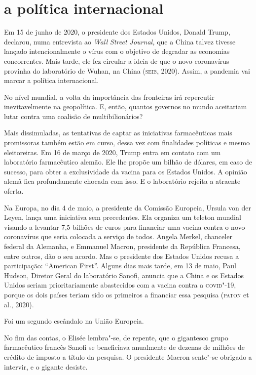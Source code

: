 \section{a política internacional}

Em 15 de junho de 2020, o presidente dos Estados Unidos, Donald Trump,
declarou, numa entrevista ao \emph{Wall Street Journal,} que a China
talvez tivesse lançado intencionalmente o vírus com o objetivo de
degradar as economias concorrentes. Mais tarde, ele fez circular a ideia
de que o novo coronavírus provinha do laboratório de Wuhan, na China
(\textsc{seib}, 2020). Assim, a pandemia vai marcar a política internacional.

No nível mundial, a volta da importância das fronteiras irá repercutir
inevitavelmente na geopolítica. E, então, quantos governos no mundo
aceitariam lutar contra uma coalisão de multibilionários?

Mais dissimuladas, as tentativas de captar as iniciativas farmacêuticas
mais promissoras também estão em curso, dessa vez com finalidades
políticas e mesmo eleitoreiras. Em 16 de março de 2020, Trump entra em
contato com um laboratório farmacêutico alemão. Ele lhe propõe um bilhão
de dólares, em caso de sucesso, para obter a exclusividade da vacina
para os Estados Unidos. A opinião alemã fica profundamente chocada com
isso. E o laboratório rejeita a atraente oferta.

Na Europa, no dia 4 de maio, a presidente da Comissão Europeia, Ursula
von der Leyen, lança uma iniciativa sem precedentes. Ela organiza um
teleton mundial visando a levantar 7,5 bilhões de euros para financiar
uma vacina contra o novo coronavírus que seria colocada a serviço de
todos. Angela Merkel, chanceler federal da Alemanha, e Emmanuel Macron,
presidente da República Francesa, entre outros, dão o seu acordo. Mas o
presidente dos Estados Unidos recusa a participação: ``American First''.
Alguns dias mais tarde, em 13 de maio, Paul Hudson, Diretor Geral do
laboratório Sanofi, anuncia que a China e os Estados Unidos seriam
prioritariamente abastecidos com a vacina contra a \textsc{covid}"-19, porque os
dois países teriam sido os primeiros a financiar essa pesquisa (\textsc{paton} et
al., 2020).

Foi um segundo escândalo na União Europeia.

No fim das contas, o Elisée lembra"-se, de repente, que o gigantesco
grupo farmacêutico francês Sanofi se beneficiava anualmente de dezenas
de milhões de crédito de imposto a título da pesquisa. O presidente
Macron sente"-se obrigado a intervir, e o gigante desiste.

